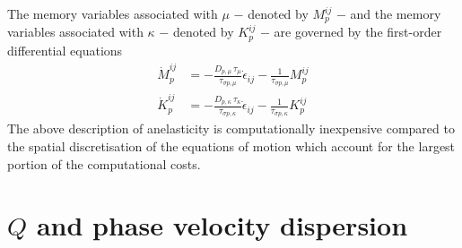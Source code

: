 The memory variables associated with $\mu$ $-$ denoted by $M_p^{ij}$
$-$ and the memory variables associated with $\kappa$ $-$ denoted by
$K_p^{ij}$ $-$ are governed by the first-order differential
equations
\begin{align}\label{E:setup34}
\dot{M}_p^{ij}&=-\frac{D_{p,\mu}\,\tau_\mu}{\tau_{\sigma p, \mu}}
\dot{\epsilon}_{ij} - \frac{1}{\tau_{\sigma p,\mu}} M_{p}^{ij}\\
\dot{K}_p^{ij}&=-\frac{D_{p,\kappa}\,\tau_\kappa}{\tau_{\sigma p, \kappa}}
\dot{\epsilon}_{ij} - \frac{1}{\tau_{\sigma p,\kappa}} K_{p}^{ij}
\end{align}
The above description of anelasticity is computationally inexpensive
compared to the spatial discretisation of the equations of motion
which account for the largest portion of the computational costs.


\section{$Q$ and phase velocity dispersion}

